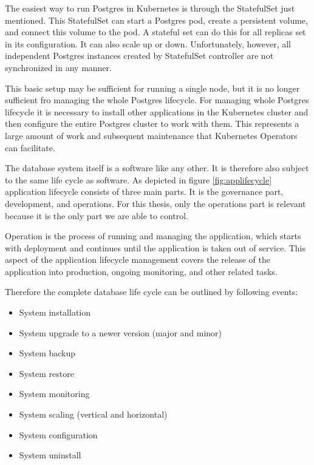The easiest way to run Postgres in Kubernetes is through the StatefulSet just mentioned. This StatefulSet can start a Postgres pod, create a persistent volume, and connect this volume to the pod. A stateful set can do this for all replicas set in its configuration. It can also scale up or down. Unfortunately, however, all independent Postgres instances created by StatefulSet controller are not synchronized in any manner.

This basic setup may be sufficient for running a single node, but it is no longer sufficient fro managing the whole Postgres lifecycle. For managing whole Postgres lifecycle it is necessary to install other applications in the Kubernetes cluster and then configure the entire Postgres cluster to work with them. This represents a large amount of work and subsequent maintenance that Kubernetes Operators can facilitate.

\label{chap:lifecycle}
The database system itself is a software like any other. It is therefore also subject to the same life cycle as software.
As depicted in figure \ref{fig:applifecycle} application lifecycle consists of three main parts. It is the governance part, development, and operations. For this thesis, only the operations part is relevant because it is the only part we are able to control.

Operation is the process of running and managing the application, which starts with deployment and continues until the application is taken out of service. This aspect of the application lifecycle management covers the release of the application into production, ongoing monitoring, and other related tasks. \cite{ALM}

Therefore the complete database life cycle can be outlined by following events:
\begin{itemize}
  \item System installation
  \item System upgrade to a newer version (major and minor)
  \item System backup
  \item System restore
  \item System monitoring
  \item System scaling (vertical and horizontal)
  \item System configuration
  \item System uninstall
\end{itemize}

